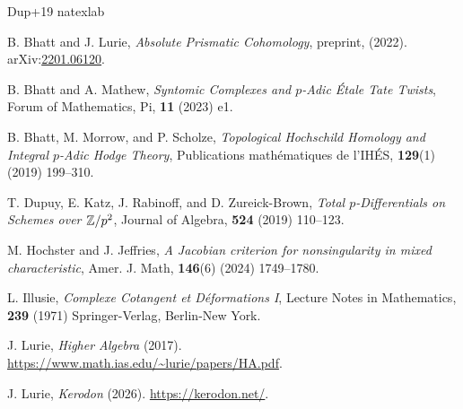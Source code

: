 \documentclass[11pt,a4paper]{amsart}
\begin{document}
\begin{thebibliography}{Dup+19}
    \expandafter\ifx\csname natexlab\endcsname\relax\def\natexlab#1{#1}\fi
    \def\au#1{#1} \def\ed#1{#1} \def\yr#1{#1}\def\at#1{#1}\def\jt#1{{#1}}
    \def\bt#1{#1}\def\bvol#1{\textbf{#1}} \def\vol#1{#1} \def\pg#1{#1}
    \def\publ#1{#1}\def\arxiv#1{#1}\def\org#1{#1}\def\st#1{\textit{#1}}\def\series#1{#1}
    
    

{\au{B. Bhatt} and \au{J. Lurie}}, \at{\textit{Absolute Prismatic Cohomology}}, preprint, (\yr{2022}). arXiv:\arxiv{\href{http://arxiv.org/abs/2201.06120}{2201.06120}}.

{\au{B. Bhatt} and \au{A. Mathew}}, \at{\textit{Syntomic Complexes and $p$-Adic \'{E}tale {{Tate}} Twists}}, \jt{Forum of Mathematics, Pi}, \bvol{11} (\yr{2023}) \pg{e1}.

{\au{B. Bhatt}, \au{M. Morrow}, and \au{P. Scholze}}, \at{\textit{Topological {{Hochschild}} Homology and Integral $p$-Adic {{Hodge}} Theory}}, \jt{Publications math\'ematiques de l'IH\'ES}, \bvol{129}(1) (\yr{2019}) \pg{{199}--{310}}.

{\au{T. Dupuy}, \au{E. Katz}, \au{J. Rabinoff}, and \au{D. {Zureick-Brown}}}, \at{\textit{Total $p$-Differentials on Schemes over {$\mathbb{Z}/p^2$}}}, \jt{Journal of Algebra}, \bvol{524} (\yr{2019}) \pg{{110}--{123}}.

{\au{M. Hochster} and \au{J. Jeffries}}, \at{\textit{A Jacobian criterion for nonsingularity in mixed characteristic}}, \jt{Amer. J. Math}, \bvol{146}(6) (\yr{2024}) \pg{{1749}--{1780}}.

{\au{L. Illusie}}, \at{\textit{{Complexe Cotangent et D\'eformations I}}}, \series{{Lecture Notes in Mathematics}}, \bvol{239} (\yr{1971}) \publ{Springer-Verlag, Berlin-New York}.

{\au{J. Lurie}}, \at{\textit{Higher {{Algebra}}}} (\yr{2017}). \url{https://www.math.ias.edu/~lurie/papers/HA.pdf}.

{\au{J. Lurie}}, \at{\textit{Kerodon}} (\yr{2026}). \url{https://kerodon.net/}.


\end{thebibliography}
\end{document}

